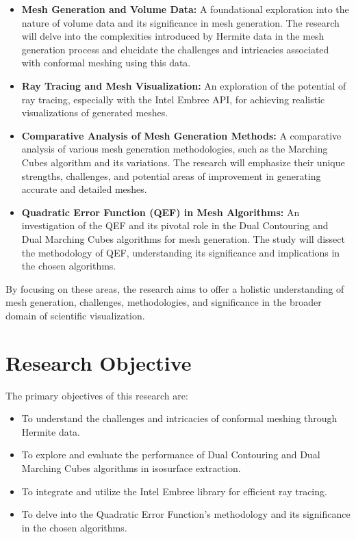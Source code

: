 \begin{itemize}
    \item \textbf{Mesh Generation and Volume Data:} A foundational exploration into the nature of volume data and its significance in mesh generation. The research will delve into the complexities introduced by Hermite data in the mesh generation process and elucidate the challenges and intricacies associated with conformal meshing using this data.
    
    \item \textbf{Ray Tracing and Mesh Visualization:} An exploration of the potential of ray tracing, especially with the Intel Embree API, for achieving realistic visualizations of generated meshes.
    
    \item \textbf{Comparative Analysis of Mesh Generation Methods:} A comparative analysis of various mesh generation methodologies, such as the Marching Cubes algorithm and its variations. The research will emphasize their unique strengths, challenges, and potential areas of improvement in generating accurate and detailed meshes.
    
    \item \textbf{Quadratic Error Function (QEF) in Mesh Algorithms:} An investigation of the QEF and its pivotal role in the Dual Contouring and Dual Marching Cubes algorithms for mesh generation. The study will dissect the methodology of QEF, understanding its significance and implications in the chosen algorithms.
\end{itemize}

\noindent By focusing on these areas, the research aims to offer a holistic understanding of mesh generation, challenges, methodologies, and significance in the broader domain of scientific visualization.


\section{Research Objective}

The primary objectives of this research are:
\begin{itemize}
    \item To understand the challenges and intricacies of conformal meshing through Hermite data.
    \item To explore and evaluate the performance of Dual Contouring and Dual Marching Cubes algorithms in isosurface extraction.
    \item To integrate and utilize the Intel Embree library for efficient ray tracing.
    \item To delve into the Quadratic Error Function's methodology and its significance in the chosen algorithms.
\end{itemize}

